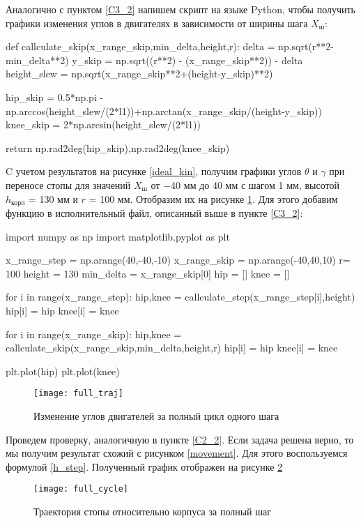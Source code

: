 Аналогично с пунктом \ref{C3_2} напишем скрипт на языке Python, чтобы получить графики изменения углов в двигателях в зависимости от ширины шага $X_{\text{ш}}$:

 \begin{python}
	def callculate_skip(x_range_skip,min_delta,height,r):
		delta = np.sqrt(r**2-min_delta**2)
		y_skip = np.sqrt((r**2) - (x_range_skip**2)) - delta
		height_slew = np.sqrt(x_range_skip**2+(height-y_skip)**2)
		
		hip_skip = 0.5*np.pi - np.arccos(height_slew/(2*l1))+np.arctan(x_range_skip/(height-y_skip))
		knee_skip = 2*np.arcsin(height_slew/(2*l1))
		
		return np.rad2deg(hip_skip),np.rad2deg(knee_skip)
\end{python}

C учетом результатов на рисунке \ref{ideal_kin}, получим графики углов $\theta$ и $\gamma$ при переносе стопы для значений $X_{\text{ш}}$ от $-$40 мм до 40 мм с шагом 1 мм, высотой $h_\text{корп}$ = 130 мм и $r$ = 100 мм. Отобразим их на рисунке \ref{full_traj}. Для этого добавим функцию в исполнительный файл, описанный выше в пункте \ref{C3_2}:

\begin{python}
	import numpy as np
	import matplotlib.pyplot as plt
	
	x_range_step = np.arange(40,-40,-10)
	x_range_skip = np.arange(-40,40,10)
	r= 100
	height = 130
	min_delta = x_range_skip[0]
	hip = []
	knee = []
	
	for i in range(x_range_step):
		hip,knee = callculate_step(x_range_step[i],height)
		hip[i] = hip
		knee[i] = knee
	
	for i in range(x_range_skip):
		hip,knee = callculate_skip(x_range_skip,min_delta,height,r)
		hip[i] = hip
		knee[i] = knee
	
	plt.plot(hip)
	plt.plot(knee)
\end{python}

\begin{figure}[h!]
	\begin{center}
		\texttt{[image: full\_traj]}
		\caption{Изменение углов двигателей за полный цикл одного шага}
		\label{full_traj}
	\end{center}
\end{figure}
Проведем проверку, аналогичную в пункте \ref{C2_2}. Если задача решена верно, то мы получим результат схожий с рисунком \ref{movement}. Для этого воспользуемся формулой \ref{h_step}. Полученный график отображен на рисунке \ref{full_cycle}
\newpage
\begin{figure}[h!]
	\begin{center}
		\texttt{[image: full\_cycle]}
		\caption{Траектория стопы относительно корпуса за полный шаг}
		\label{full_cycle}
	\end{center}
\end{figure}

\newpage